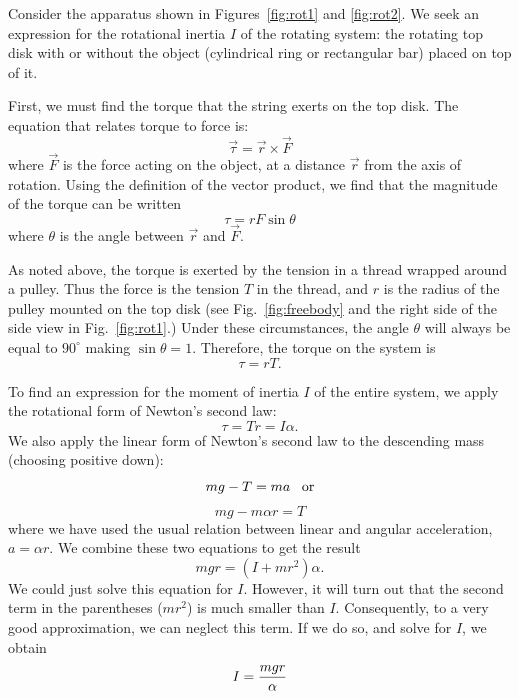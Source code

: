 Consider the apparatus shown in Figures~\ref{fig:rot1} and
\ref{fig:rot2}.  We seek an expression for the rotational inertia
$I$ of the rotating system:  the rotating top disk with or without the object
(cylindrical ring or rectangular bar) placed on top of it.

First, we must find the torque that the string exerts on the top
disk.  The equation that relates torque to force is:
\begin{equation}
\vec{\tau} = \vec{r} \times \vec{F}
\end{equation}
where $\vec{F}$ is the force acting on the object, at a distance
$\vec{r}$ from
the axis of rotation.  Using the definition of the vector
product, we find that the magnitude of the torque can be written
\begin{equation}
\tau = rF \sin\theta
\end{equation}
where $\theta$ is the angle between $\vec{r}$ and $\vec{F}$.

As noted above, the torque is exerted by the
tension in a thread wrapped around a pulley.
Thus the force is the tension $T$ in the thread, and $r$ is the radius
of the pulley mounted on the top disk (see
Fig.~\ref{fig:freebody} and the right side of the side
view in  Fig.~\ref{fig:rot1}.)  Under these circumstances, the angle
$\theta$ will always be equal to $90^{\circ}$ making $\sin\theta = 1$.
Therefore, the torque on the system is
\begin{equation}
\tau = rT.
\end{equation}

To find an expression for the moment of inertia $I$ of the entire
system, we apply the rotational form of Newton's second law:
\begin{equation}
\tau = Tr = I \alpha.
\end{equation}
We also apply the linear form of Newton's second law to the
descending mass (choosing positive down):
\begin{equation}
mg -T = ma  \;\;\; {\rm or}
\end{equation}
\begin{equation}
mg -m \alpha r = T
\end{equation}
where we have used the usual relation between linear and angular acceleration,
$a=\alpha r$.  We combine these two equations to get the result
\begin{equation}
mgr = (I + mr^{2}) \alpha  .
\end{equation}
We could just solve this equation for $I$.  However, it will turn
out that the second term in the parentheses ($ mr^{2}$) is much smaller
than $I$. Consequently, to a very good approximation, we can neglect
this term.  If we do so, and solve for $I$, we obtain
\begin{equation}
I = {mgr \over \alpha}
\label{eq:rotfree}
\end{equation}



